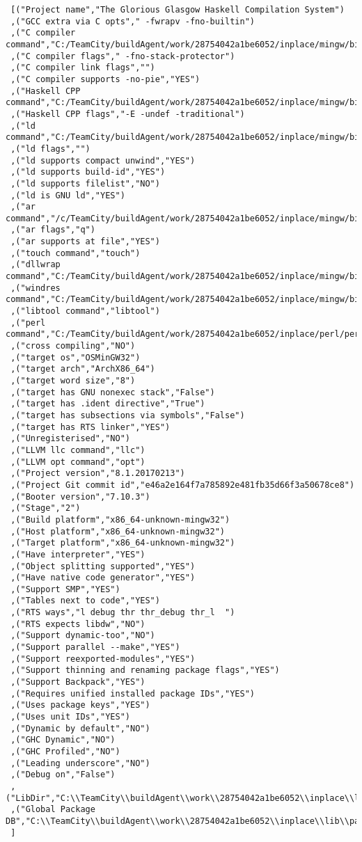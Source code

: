 \begin{verbatim}
 [("Project name","The Glorious Glasgow Haskell Compilation System")
 ,("GCC extra via C opts"," -fwrapv -fno-builtin")
 ,("C compiler command","C:/TeamCity/buildAgent/work/28754042a1be6052/inplace/mingw/bin/gcc.exe")
 ,("C compiler flags"," -fno-stack-protector")
 ,("C compiler link flags","")
 ,("C compiler supports -no-pie","YES")
 ,("Haskell CPP command","C:/TeamCity/buildAgent/work/28754042a1be6052/inplace/mingw/bin/gcc.exe")
 ,("Haskell CPP flags","-E -undef -traditional")
 ,("ld command","C:/TeamCity/buildAgent/work/28754042a1be6052/inplace/mingw/bin/ld.exe")
 ,("ld flags","")
 ,("ld supports compact unwind","YES")
 ,("ld supports build-id","YES")
 ,("ld supports filelist","NO")
 ,("ld is GNU ld","YES")
 ,("ar command","/c/TeamCity/buildAgent/work/28754042a1be6052/inplace/mingw/bin/ar")
 ,("ar flags","q")
 ,("ar supports at file","YES")
 ,("touch command","touch")
 ,("dllwrap command","C:/TeamCity/buildAgent/work/28754042a1be6052/inplace/mingw/bin/dllwrap.exe")
 ,("windres command","C:/TeamCity/buildAgent/work/28754042a1be6052/inplace/mingw/bin/windres.exe")
 ,("libtool command","libtool")
 ,("perl command","C:/TeamCity/buildAgent/work/28754042a1be6052/inplace/perl/perl")
 ,("cross compiling","NO")
 ,("target os","OSMinGW32")
 ,("target arch","ArchX86_64")
 ,("target word size","8")
 ,("target has GNU nonexec stack","False")
 ,("target has .ident directive","True")
 ,("target has subsections via symbols","False")
 ,("target has RTS linker","YES")
 ,("Unregisterised","NO")
 ,("LLVM llc command","llc")
 ,("LLVM opt command","opt")
 ,("Project version","8.1.20170213")
 ,("Project Git commit id","e46a2e164f7a785892e481fb35d66f3a50678ce8")
 ,("Booter version","7.10.3")
 ,("Stage","2")
 ,("Build platform","x86_64-unknown-mingw32")
 ,("Host platform","x86_64-unknown-mingw32")
 ,("Target platform","x86_64-unknown-mingw32")
 ,("Have interpreter","YES")
 ,("Object splitting supported","YES")
 ,("Have native code generator","YES")
 ,("Support SMP","YES")
 ,("Tables next to code","YES")
 ,("RTS ways","l debug thr thr_debug thr_l  ")
 ,("RTS expects libdw","NO")
 ,("Support dynamic-too","NO")
 ,("Support parallel --make","YES")
 ,("Support reexported-modules","YES")
 ,("Support thinning and renaming package flags","YES")
 ,("Support Backpack","YES")
 ,("Requires unified installed package IDs","YES")
 ,("Uses package keys","YES")
 ,("Uses unit IDs","YES")
 ,("Dynamic by default","NO")
 ,("GHC Dynamic","NO")
 ,("GHC Profiled","NO")
 ,("Leading underscore","NO")
 ,("Debug on","False")
 ,("LibDir","C:\\TeamCity\\buildAgent\\work\\28754042a1be6052\\inplace\\lib")
 ,("Global Package DB","C:\\TeamCity\\buildAgent\\work\\28754042a1be6052\\inplace\\lib\\package.conf.d")
 ]
\end{verbatim}
